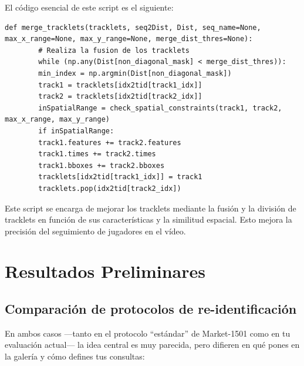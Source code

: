 \documentclass[12pt, a4paper, twoside]{article}
\begin{document}
	El código esencial de este script es el siguiente:
	
	\begin{lstlisting}[style=pythonstyle]
		def merge_tracklets(tracklets, seq2Dist, Dist, seq_name=None, max_x_range=None, max_y_range=None, merge_dist_thres=None):
		# Realiza la fusion de los tracklets
		while (np.any(Dist[non_diagonal_mask] < merge_dist_thres)):
		min_index = np.argmin(Dist[non_diagonal_mask])
		track1 = tracklets[idx2tid[track1_idx]]
		track2 = tracklets[idx2tid[track2_idx]]
		inSpatialRange = check_spatial_constraints(track1, track2, max_x_range, max_y_range)
		if inSpatialRange:
		track1.features += track2.features
		track1.times += track2.times
		track1.bboxes += track2.bboxes
		tracklets[idx2tid[track1_idx]] = track1
		tracklets.pop(idx2tid[track2_idx])
	\end{lstlisting}
	
	Este script se encarga de mejorar los tracklets mediante la fusión y la división de tracklets en función de sus características y la similitud espacial. Esto mejora la precisión del seguimiento de jugadores en el vídeo.
	
	
	
	\section{Resultados Preliminares}
	
 	\subsection{Comparación de protocolos de re-identificación} \cite{7410490}
 	
 	En ambos casos —tanto en el protocolo “estándar” de Market-1501 como en tu evaluación actual— la idea central es muy parecida, pero difieren en qué pones en la galería y cómo defines tus consultas:
 	
\end{document}
